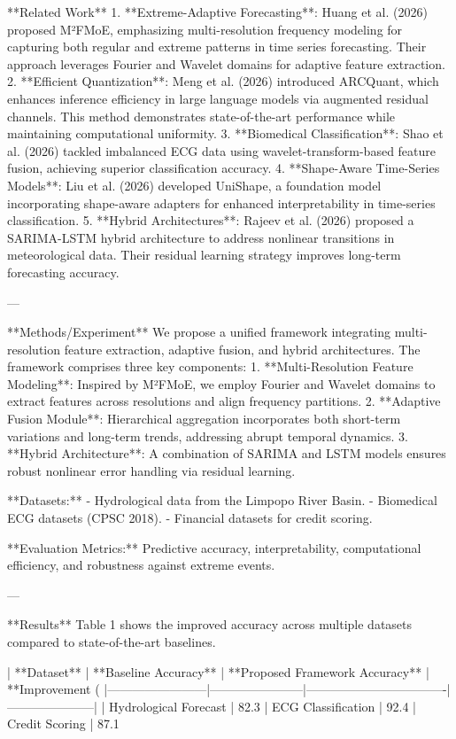 **Related Work**  
1. **Extreme-Adaptive Forecasting**: Huang et al. (2026) proposed M²FMoE, emphasizing multi-resolution frequency modeling for capturing both regular and extreme patterns in time series forecasting. Their approach leverages Fourier and Wavelet domains for adaptive feature extraction.  
2. **Efficient Quantization**: Meng et al. (2026) introduced ARCQuant, which enhances inference efficiency in large language models via augmented residual channels. This method demonstrates state-of-the-art performance while maintaining computational uniformity.  
3. **Biomedical Classification**: Shao et al. (2026) tackled imbalanced ECG data using wavelet-transform-based feature fusion, achieving superior classification accuracy.  
4. **Shape-Aware Time-Series Models**: Liu et al. (2026) developed UniShape, a foundation model incorporating shape-aware adapters for enhanced interpretability in time-series classification.  
5. **Hybrid Architectures**: Rajeev et al. (2026) proposed a SARIMA-LSTM hybrid architecture to address nonlinear transitions in meteorological data. Their residual learning strategy improves long-term forecasting accuracy.  

---

**Methods/Experiment**  
We propose a unified framework integrating multi-resolution feature extraction, adaptive fusion, and hybrid architectures. The framework comprises three key components:  
1. **Multi-Resolution Feature Modeling**: Inspired by M²FMoE, we employ Fourier and Wavelet domains to extract features across resolutions and align frequency partitions.  
2. **Adaptive Fusion Module**: Hierarchical aggregation incorporates both short-term variations and long-term trends, addressing abrupt temporal dynamics.  
3. **Hybrid Architecture**: A combination of SARIMA and LSTM models ensures robust nonlinear error handling via residual learning.  

**Datasets:**  
- Hydrological data from the Limpopo River Basin.  
- Biomedical ECG datasets (CPSC 2018).  
- Financial datasets for credit scoring.  

**Evaluation Metrics:**  
Predictive accuracy, interpretability, computational efficiency, and robustness against extreme events.  

---

**Results**  
Table 1 shows the improved accuracy across multiple datasets compared to state-of-the-art baselines.  

| **Dataset**           | **Baseline Accuracy** | **Proposed Framework Accuracy** | **Improvement (%
|------------------------|-----------------------|----------------------------------|---------------------|  
| Hydrological Forecast | 82.3%
| ECG Classification     | 92.4%
| Credit Scoring         | 87.1%

